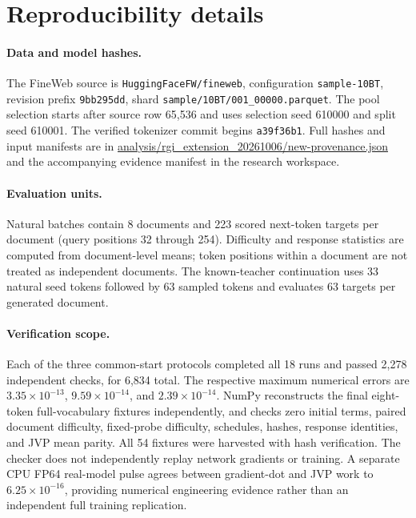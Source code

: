 \section{Reproducibility details}

\paragraph{Data and model hashes.}
The FineWeb source is \texttt{HuggingFaceFW/fineweb}, configuration \texttt{sample-10BT}, revision prefix \texttt{9bb295dd}, shard \texttt{sample/10BT/001\_00000.parquet}.  The pool selection starts after source row 65,536 and uses selection seed 610000 and split seed 610001.  The verified tokenizer commit begins \texttt{a39f36b1}.  Full hashes and input manifests are in \url{analysis/rgi_extension_20261006/new-provenance.json} and the accompanying evidence manifest in the research workspace.

\paragraph{Evaluation units.}
Natural batches contain 8 documents and 223 scored next-token targets per document (query positions 32 through 254).  Difficulty and response statistics are computed from document-level means; token positions within a document are not treated as independent documents.  The known-teacher continuation uses 33 natural seed tokens followed by 63 sampled tokens and evaluates 63 targets per generated document.

\paragraph{Verification scope.}
Each of the three common-start protocols completed all 18 runs and passed 2,278 independent checks, for 6,834 total.  The respective maximum numerical errors are \(3.35\times10^{-13}\), \(9.59\times10^{-14}\), and \(2.39\times10^{-14}\).  NumPy reconstructs the final eight-token full-vocabulary fixtures independently, and checks zero initial terms, paired document difficulty, fixed-probe difficulty, schedules, hashes, response identities, and JVP mean parity.  All 54 fixtures were harvested with hash verification.  The checker does not independently replay network gradients or training.  A separate CPU FP64 real-model pulse agrees between gradient-dot and JVP work to \(6.25\times10^{-16}\), providing numerical engineering evidence rather than an independent full training replication.

